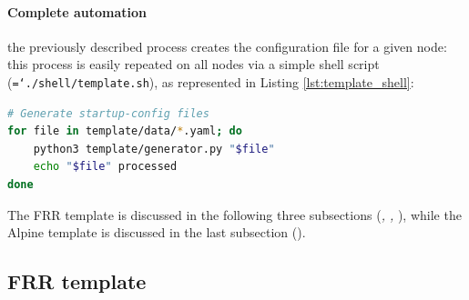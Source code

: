 \documentclass{report}
\newcommand{\monospaced}[1]{\texttt{\hyphenchar\font=`\-#1}}
\begin{document}
\paragraph{Complete automation} the previously described process creates the configuration file for a given node: this process is easily repeated on all nodes via a simple shell script (\monospaced{./shell/template.sh}), as represented in Listing \ref{lst:template_shell}:
\begin{lstlisting}[language=sh, style=styleShell, caption=template.sh file, label=lst:template_shell]      
# Generate startup-config files
for file in template/data/*.yaml; do
    python3 template/generator.py "$file"
    echo "$file" processed
done
\end{lstlisting}

The FRR template is discussed in the following three subsections (\textit{, , }), while the Alpine template is discussed in the last subsection (\textit{}).
\subsection{FRR template}
\end{document}
